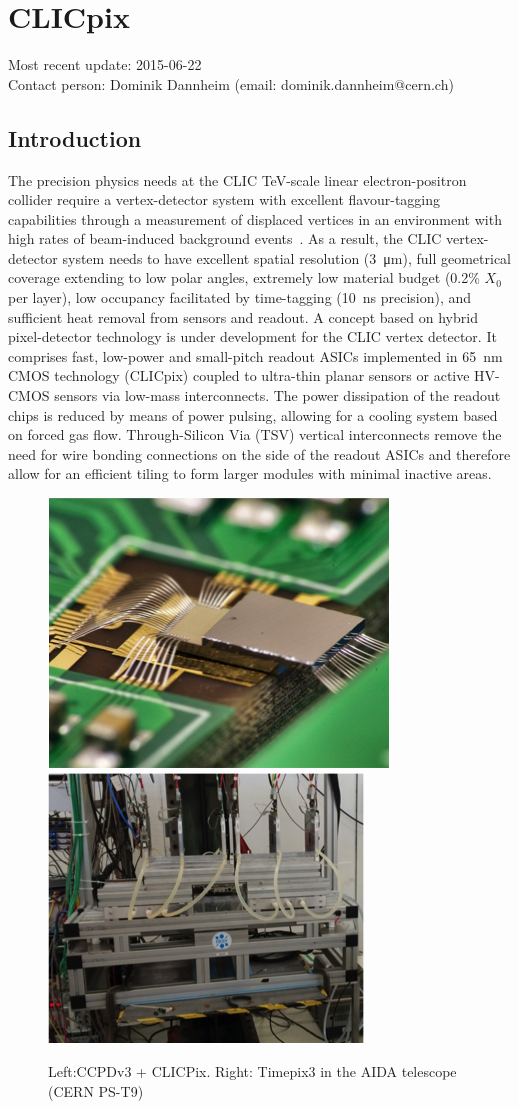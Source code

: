 \section{CLICpix}
Most recent update: 2015-06-22 \\
Contact person: Dominik Dannheim (email: dominik.dannheim@cern.ch)

\subsection{Introduction}
 The precision physics needs at the CLIC TeV-scale linear electron-positron collider
require a vertex-detector system with excellent flavour-tagging capabilities through
a measurement of displaced vertices in an environment with high rates
of beam-induced background events~\cite{Miyamoto:1425915}.
As a result, the CLIC vertex-detector system needs to have excellent spatial resolution
(\SI{3}{\micro\meter}),
full geometrical coverage extending to low polar angles, extremely low material budget
(0.2\% $X_0$ per layer),
low occupancy facilitated by time-tagging (\SI{10}{ns} precision), and sufficient heat
removal from sensors and readout.
A concept based on hybrid pixel-detector technology is under development
for the CLIC vertex detector. It comprises fast, low-power and small-pitch readout
ASICs implemented in \SI{65}{nm} CMOS technology (CLICpix) coupled to ultra-thin planar sensors
or active HV-CMOS sensors via low-mass interconnects. The power dissipation of the
readout chips is reduced by means of power pulsing, allowing for a cooling system
based on forced gas flow. Through-Silicon Via (TSV) vertical interconnects remove the need for wire
bonding connections on the side of the readout ASICs
and therefore allow for an efficient tiling to form larger modules with minimal
inactive areas.

\begin{figure}
    \centering
    \includegraphics[width=.4\textwidth]{VertexDetector/CLICPIX/ccpdv3_clicpix.png}
    \includegraphics[width=.4\textwidth]{VertexDetector/CLICPIX/timepix3_telescope.png}
    \caption{Left:CCPDv3 + CLICPix. Right: Timepix3 in the AIDA telescope (CERN PS-T9)}
    \label{fig:VertexDetector:clicpix}
\end{figure}

